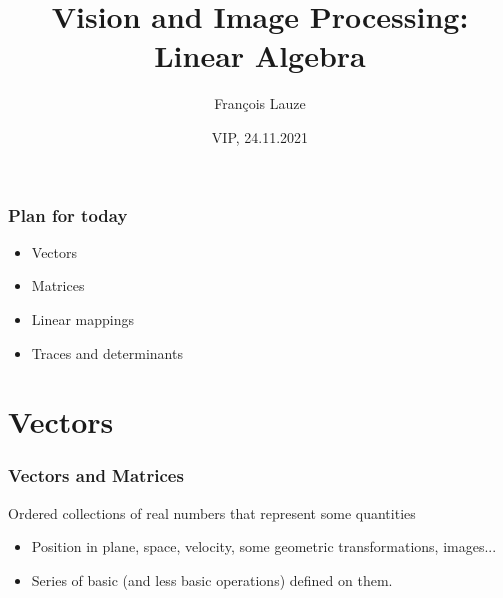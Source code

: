 \documentclass[8pt,dvipsnames]{beamer}
\title{Vision and Image Processing:\\ Linear Algebra}
\author[F.~Lauze] %
{Fran{\c c}ois Lauze}
\institute[DIKU] %
{
  Department of Computer Science\\
  University of Copenhagen
}
\date[2020-21 B2]{VIP, 24.11.2021}
\begin{document}
\maketitle








 
  

\begin{frame}
  \frametitle{Plan for today}
  \begin{itemize}
  \item Vectors
  \item Matrices
  \item Linear mappings
  \item Traces and determinants
  \end{itemize}
\end{frame}


\section{Vectors}

\begin{frame}
  \frametitle{Vectors and Matrices}
  Ordered collections of real numbers that represent some quantities
  \begin{itemize}
  \item Position in plane, space, velocity, some geometric transformations, images...
  \item Series of basic (and less basic operations)  defined on them.
  \end{itemize}
\end{frame}
\end{document}
